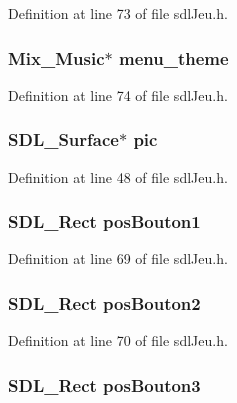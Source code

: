Definition at line 73 of file sdl\-Jeu.\-h.

\hypertarget{structsdl_jeu_af21ea3aee1c3c164e57edddad03634fe}{
\subsubsection[{menu\-\_\-theme}]{\setlength{\rightskip}{0pt plus 5cm}Mix\-\_\-\-Music$\ast$ menu\-\_\-theme}}\label{structsdl_jeu_af21ea3aee1c3c164e57edddad03634fe}


Definition at line 74 of file sdl\-Jeu.\-h.

\hypertarget{structsdl_jeu_a761714fd2e059e5f8b4e0a5246f0413f}{
\subsubsection[{pic}]{\setlength{\rightskip}{0pt plus 5cm}S\-D\-L\-\_\-\-Surface$\ast$ pic}}\label{structsdl_jeu_a761714fd2e059e5f8b4e0a5246f0413f}


Definition at line 48 of file sdl\-Jeu.\-h.

\hypertarget{structsdl_jeu_af6051c9f489b13415829103eab2689af}{
\subsubsection[{pos\-Bouton1}]{\setlength{\rightskip}{0pt plus 5cm}S\-D\-L\-\_\-\-Rect pos\-Bouton1}}\label{structsdl_jeu_af6051c9f489b13415829103eab2689af}


Definition at line 69 of file sdl\-Jeu.\-h.

\hypertarget{structsdl_jeu_a23f4550911b88a484d4530c86026c191}{
\subsubsection[{pos\-Bouton2}]{\setlength{\rightskip}{0pt plus 5cm}S\-D\-L\-\_\-\-Rect pos\-Bouton2}}\label{structsdl_jeu_a23f4550911b88a484d4530c86026c191}


Definition at line 70 of file sdl\-Jeu.\-h.

\hypertarget{structsdl_jeu_a9e93c0144eeff3329f7a5ee934eca81d}{
\subsubsection[{pos\-Bouton3}]{\setlength{\rightskip}{0pt plus 5cm}S\-D\-L\-\_\-\-Rect pos\-Bouton3}}\label{structsdl_jeu_a9e93c0144eeff3329f7a5ee934eca81d}


